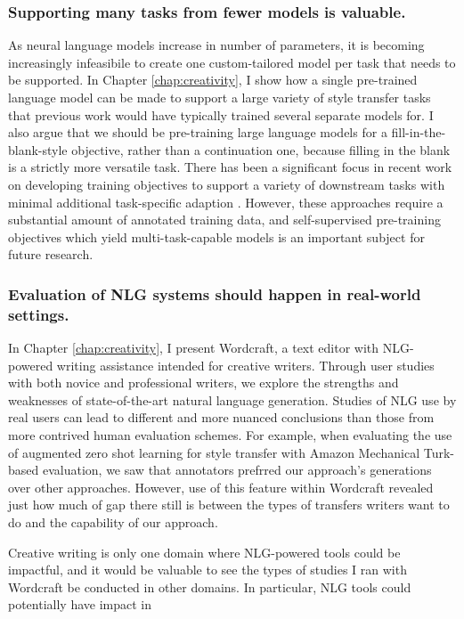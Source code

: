 \subsubsection{Supporting many tasks from fewer models is valuable.}
	As neural language models increase in number of parameters, it is becoming increasingly infeasibile to create one custom-tailored model per task that needs to be supported.
	In Chapter \ref{chap:creativity}, I show how a single pre-trained language model can be made to support a large variety of style transfer tasks that previous work would have typically trained several separate models for.
	I also argue that we should be pre-training large language models for a fill-in-the-blank-style objective, rather than a continuation one, because filling in the blank is a strictly more versatile task.
	There has been a significant focus in recent work on developing training objectives to support a variety of downstream tasks with minimal additional task-specific adaption \citep{wei2021finetuned,sanh2021multitask}.
	However, these approaches require a substantial amount of annotated training data, and self-supervised pre-training objectives which yield multi-task-capable models is an important subject for future research.

\subsubsection{Evaluation of NLG systems should happen in real-world settings.}
	In Chapter \ref{chap:creativity}, I present Wordcraft, a text editor with NLG-powered writing assistance intended for creative writers.
	Through user studies with both novice and professional writers, we explore the strengths and weaknesses of state-of-the-art natural language generation.
	Studies of NLG use by real users can lead to different and more nuanced conclusions than those from more contrived human evaluation schemes.
	For example, when evaluating the use of augmented zero shot learning for style transfer with Amazon Mechanical Turk-based evaluation, we saw that annotators prefrred our approach's generations over other approaches.
	However, use of this feature within Wordcraft revealed just how much of gap there still is between the types of transfers writers want to do and the capability of our approach.

	Creative writing is only one domain where NLG-powered tools could be impactful, and it would be valuable to see the types of studies I ran with Wordcraft be conducted in other domains.
	In particular, NLG tools could potentially have impact in \TODO{}
